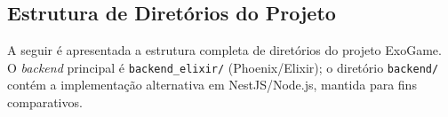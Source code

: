 \documentclass[
	12pt,
	openany,
	oneside,
	a4paper,
	english,
	brazil
]{abntex2}
\begin{document}


\begin{apendicesenv}

\partapendices

\chapter{Estrutura de Diretórios do Projeto}\label{ap:estrutura}

A seguir é apresentada a estrutura completa de diretórios do projeto ExoGame. O \textit{backend} principal é \texttt{backend\_elixir/} (Phoenix/Elixir); o diretório \texttt{backend/} contém a implementação alternativa em NestJS/Node.js, mantida para fins comparativos.


\end{apendicesenv}
\end{document}

